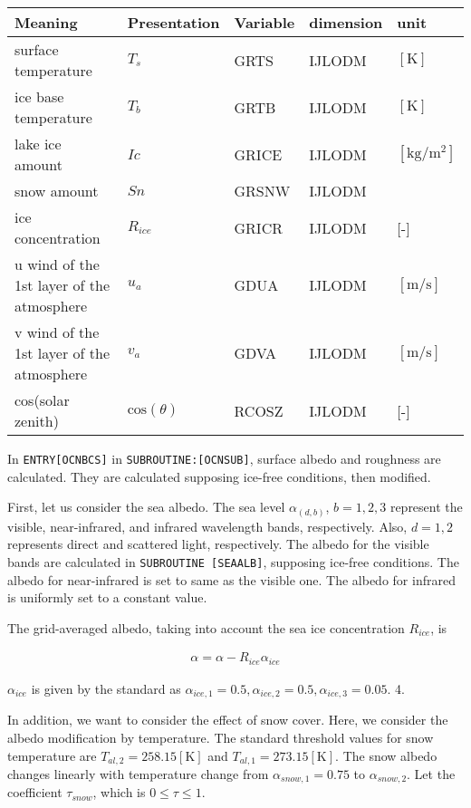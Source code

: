 \setlength\LTleft{0pt}\setlength\LTright{0pt}\begin{longtable}[]{@{}lllll@{}}
\toprule\relax
Meaning & Presentation & Variable & dimension & unit \\
\midrule\relax
\endhead
surface temperature & \(T_s\) & GRTS & IJLODM & \(\mathrm{[K]}\) \\
ice base temperature & \(T_b\) & GRTB & IJLODM & \(\mathrm{[K]}\) \\
lake ice amount & \(Ic\) & GRICE & IJLODM & \(\mathrm{[kg/m^2]}\) \\
snow amount & \(Sn\) & GRSNW & IJLODM & \\
ice concentration & \(R_{ice}\) & GRICR & IJLODM & {[}-{]} \\
u wind of the 1st layer of the atmosphere & \(u_a\) & GDUA & IJLODM &
\(\mathrm{[m/s]}\) \\
v wind of the 1st layer of the atmosphere & \(v_a\) & GDVA & IJLODM &
\(\mathrm{[m/s]}\) \\
cos(solar zenith) & \(\mathrm{cos}(\theta)\) & RCOSZ & IJLODM &
{[}-{]} \\
\bottomrule
\end{longtable}

In \texttt{ENTRY{[}OCNBCS{]}} in \texttt{SUBROUTINE:{[}OCNSUB{]}},
surface albedo and roughness are calculated. They are calculated
supposing ice-free conditions, then modified.

First, let us consider the sea albedo. The sea level \(\alpha_{(d,b)}\),
\(b=1,2,3\) represent the visible, near-infrared, and infrared
wavelength bands, respectively. Also, \(d=1,2\) represents direct and
scattered light, respectively. The albedo for the visible bands are
calculated in \texttt{SUBROUTINE\ {[}SEAALB{]}}, supposing ice-free
conditions. The albedo for near-infrared is set to same as the visible
one. The albedo for infrared is uniformly set to a constant value.

The grid-averaged albedo, taking into account the sea ice concentration
\(R_{ice}\), is

\begin{eqnarray}
    \alpha = \alpha -R_{ice} \alpha_{ice}
\end{eqnarray}

\(\alpha_{ice}\) is given by the standard as
\(\alpha_{ice,1}=0.5,\alpha_{ice,2}=0.5,\alpha_{ice,3}=0.05\). 4.

In addition, we want to consider the effect of snow cover. Here, we
consider the albedo modification by temperature. The standard threshold
values for snow temperature are \(T_{al,2}=258.15 \mathrm{[K]}\) and
\(T_{al,1}=273.15 \mathrm{[K]}\). The snow albedo changes linearly with
temperature change from \(\alpha_{snow,1}=0.75\) to
\(\alpha_{ snow,2}\). Let the coefficient \(\tau_{snow}\), which is
\(0\le \tau \le 1\).

